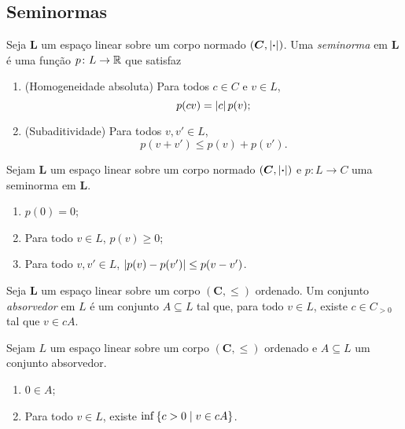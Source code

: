 \subsection{Seminormas}

\begin{definition}
Seja $\bm L$ um espaço linear sobre um corpo normado $(\bm C,\left\vert{\bm{\cdot}}\right\vert)$. Uma \emph{seminorma} em $\bm L$ é uma função $p\colon L \to \mathbb{R}$
que satisfaz
	\begin{enumerate}
	\item (Homogeneidade absoluta) Para todos $c \in C$ e $v \in L$,
		\begin{equation*}
		p(cv) = \left\vert{c}\right\vert p(v);
		\end{equation*}
	\item (Subaditividade) Para todos $v,v' \in L$,
		\begin{equation*}
		p(v + v') \leq p(v) + p(v').
		\end{equation*}
	\end{enumerate}
\end{definition}

\begin{proposition}
Sejam $\bm L$ um espaço linear sobre um corpo normado $(\bm C,\left\vert{\bm{\cdot}}\right\vert)$ e $p\colon L \to C$ uma seminorma em $\bm L$.
	\begin{enumerate}
	\item $p(0)=0$;
	\item Para todo $v \in L$, $p(v) \geq 0$;
	\item Para todo $v,v' \in L$, $\left\vert{p(v)-p(v')}\right\vert \leq p(v-v')$.
	\end{enumerate}
\end{proposition}

\begin{definition}
Seja $\bm L$ um espaço linear sobre um corpo $(\bm C,\leq)$ ordenado. Um conjunto \emph{absorvedor} em $L$ é um conjunto $A \subseteq L$ tal que, para todo $v \in L$, existe $c \in C_{>0}$ tal que $v \in cA$.
\end{definition}

\begin{proposition}
Sejam $L$ um espaço linear sobre um corpo $(\bm C,\leq)$ ordenado e $A \subseteq L$ um conjunto absorvedor.
	\begin{enumerate}
	\item $0 \in A$;
	\item Para todo $v \in L$, existe $\inf\left\{ c>0 \;\middle\vert\; v \in cA \right\}$.
	\end{enumerate}
\end{proposition}

